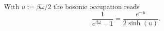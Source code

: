 \documentclass{article}
\begin{document}
With $u := \beta\omega/2$ the bosonic occupation reads
\begin{equation}
\frac{1}{e^{\beta\omega}-1} = \frac{e^{-u}}{2\sinh(u)} .
\label{eq:nb}
\end{equation}
\end{document}
